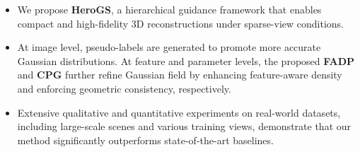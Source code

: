 \begin{itemize}
   \item  We propose \textbf{HeroGS}, a hierarchical guidance framework that enables compact and high-fidelity 3D reconstructions under sparse-view conditions.
   \item At image level, pseudo-labels are generated to promote more accurate Gaussian distributions. At  feature and parameter levels, the proposed \textbf{FADP} and \textbf{CPG} further refine Gaussian field by enhancing feature-aware density and enforcing geometric consistency, respectively.


   \item Extensive qualitative and quantitative experiments on real-world datasets, including large-scale scenes and various training views, demonstrate that our method significantly outperforms state-of-the-art baselines.
\end{itemize}


